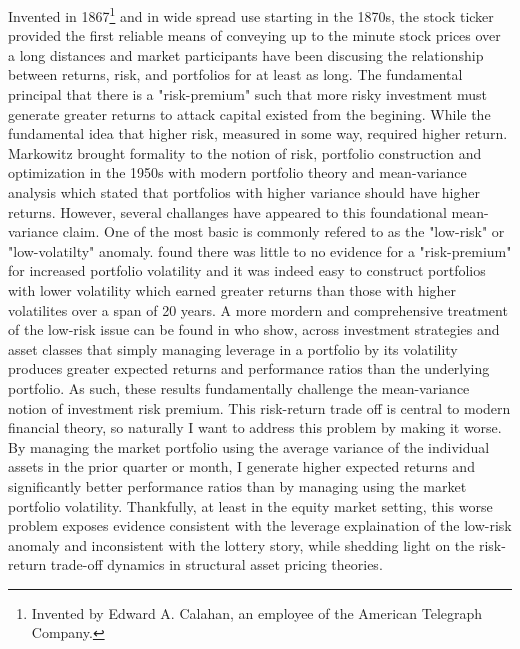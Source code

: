 \noindent Invented in 1867\footnote{Invented by Edward A. Calahan, an employee of the American Telegraph Company.} and in wide spread use starting in the 1870s, the stock ticker provided the first reliable means of conveying up to the minute stock prices over a long distances and market participants have been discusing the relationship between returns, risk, and portfolios for at least as long.\citep{rutterford_financial_2016} The fundamental principal that there is a "risk-premium" such that more risky investment must generate greater returns to attack capital existed from the begining. While the fundamental idea that higher risk, measured in some way, required higher return. Markowitz brought formality to the notion of risk, portfolio construction and optimization in the 1950s with modern portfolio theory and mean-variance analysis which stated that portfolios with higher variance should have higher returns.\citep{markowitz_portfolio_1952} However, several challanges have appeared to this foundational mean-variance claim. One of the most basic is commonly refered to as the "low-risk" or "low-volatilty" anomaly. \citet{haugen_1972} found there was little to no evidence for a "risk-premium" for increased portfolio volatility and it was indeed easy to construct portfolios with lower volatility which earned greater returns than those with higher volatilites over a span of 20 years. A more mordern and comprehensive treatment of the low-risk issue can be found in \citet{moreira_volatility-managed_2017} who show, across investment strategies and asset classes that simply managing leverage in a portfolio by its volatility produces greater expected returns and performance ratios than the underlying portfolio. As such, these results fundamentally challenge the mean-variance notion of investment risk premium. This risk-return trade off is central to modern financial theory, so naturally I want to address this problem by making it worse. By managing the market portfolio using the average variance of the individual assets in the prior quarter or month, I generate higher expected returns and significantly better performance ratios than by managing using the market portfolio volatility. Thankfully, at least in the equity market setting, this worse problem exposes evidence consistent with the leverage explaination of the low-risk anomaly and inconsistent with the lottery story, while shedding light on the risk-return trade-off dynamics in structural asset pricing theories.


